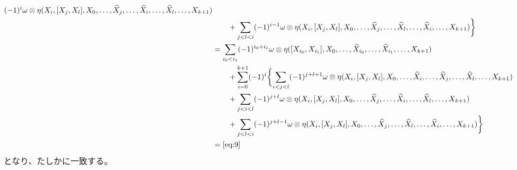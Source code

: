 \documentclass[report]{jlreq}
\begin{document}
\begin{alignat}{1}
            (-1)^{i}
            \omega \otimes \eta(
                X_i,
                [X_j, X_l],
                X_0, \dots,
                \what{X}_j, \dots,
                \what{X}_i, \dots,
                \what{X}_l, \dots,
                X_{k + 1}
            ) \\
    &\qquad
            + \sum_{j < l < i}
            (-1)^{i - 1}
            \omega \otimes \eta(
                X_i,
                [X_j, X_l],
                X_0, \dots,
                \what{X}_j, \dots,
                \what{X}_l, \dots,
                \what{X}_i, \dots,
                X_{k + 1}
            )
        \biggr\} \\
    &= \sum_{i_0 < i_1}
        (-1)^{i_0 + i_1}
        \omega \otimes \eta(
            [X_{i_0}, X_{i_1}],
            X_0, \dots, \what{X}_{i_0}, \dots, \what{X}_{i_1}, \dots, X_{k + 1}
        ) \\
    &\qquad
        + \sum_{i = 0}^{k + 1}
        (-1)^{i}
        \biggl\{
            \sum_{i < j < l}
            (-1)^{j + l + 1}
            \omega \otimes \eta(
                X_i,
                [X_j, X_l],
                X_0, \dots,
                \what{X}_i, \dots,
                \what{X}_j, \dots,
                \what{X}_l, \dots,
                X_{k + 1}
            ) \\
    &\qquad
            + \sum_{j < i < l}
            (-1)^{j + l}
            \omega \otimes \eta(
                X_i,
                [X_j, X_l],
                X_0, \dots,
                \what{X}_j, \dots,
                \what{X}_i, \dots,
                \what{X}_l, \dots,
                X_{k + 1}
            ) \\
    &\qquad
            + \sum_{j < l < i}
            (-1)^{j + l - 1}
            \omega \otimes \eta(
                X_i,
                [X_j, X_l],
                X_0, \dots,
                \what{X}_j, \dots,
                \what{X}_l, \dots,
                \what{X}_i, \dots,
                X_{k + 1}
            )
        \biggr\} \\
    &= \cref{eq:9}
\end{alignat}
となり、たしかに一致する。
\end{document}
